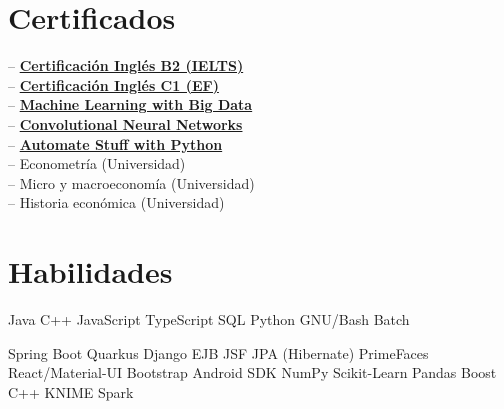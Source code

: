 \documentclass[]{CV-JuanCamiloFlorez}
\begin{document}
\begin{minipage}[t]{0.33\textwidth}
\section{Certificados}
-- \textbf{\href{https://jcamilo.co/IELTS-2022.pdf}{Certificación Inglés B2 (IELTS)}} \\
-- \textbf{\href{https://www.efset.org/cert/j8ebfw}{Certificación Inglés C1 (EF)}} \\
-- \textbf{\href{https://www.coursera.org/account/accomplishments/certificate/8MS64GGYWDT5?utm_medium=certificate&utm_source=link&utm_campaign=copybutton_certificate}{Machine Learning with Big Data}} \\
-- \textbf{\href{https://www.coursera.org/account/accomplishments/certificate/KFN2XJC2KP92?utm_medium=certificate&utm_source=link&utm_campaign=copybutton_certificate}{Convolutional Neural Networks}} \\
-- \textbf{\href{https://www.udemy.com/certificate/UC-ZHLLMBQA}{Automate Stuff with Python}} \\
-- Econometría (Universidad) \\
-- Micro y macroeconomía (Universidad) \\
-- Historia económica (Universidad) \\
\smallskip
\scriptsize{}
\sectionsep


\section{Habilidades}
    \textbullet{} Java
    \textbullet{} C++
    \textbullet{} JavaScript
    \textbullet{} TypeScript
    \textbullet{} SQL
    \textbullet{} Python
    \textbullet{} GNU/Bash
    \textbullet{} Batch

    \textbullet{} Spring Boot
    \textbullet{} Quarkus
    \textbullet{} Django
    \textbullet{} EJB JSF JPA (Hibernate) PrimeFaces
    \textbullet{} React/Material-UI
    \textbullet{} Bootstrap
    \textbullet{} Android SDK
    \textbullet{} NumPy
    \textbullet{} Scikit-Learn
    \textbullet{} Pandas
    \textbullet{} Boost C++
    \textbullet{} KNIME
    \textbullet{} Spark


\end{minipage}
\end{document}
